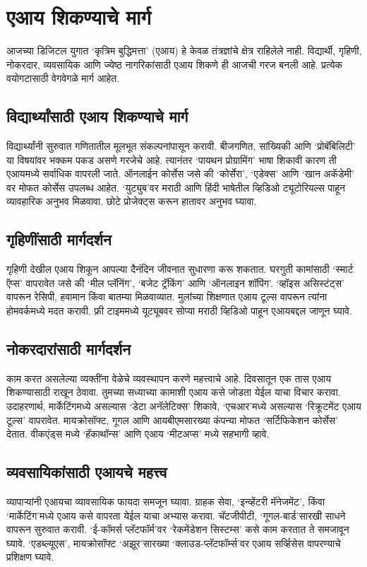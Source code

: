 \chapter{एआय शिकण्याचे मार्ग}

आजच्या डिजिटल युगात `कृत्रिम बुद्धिमत्ता' (एआय) हे केवळ तंत्रज्ञांचे क्षेत्र राहिलेले नाही. विद्यार्थी, गृहिणी, नोकरदार, व्यवसायिक आणि ज्येष्ठ नागरिकांसाठी एआय शिकणे ही आजची गरज बनली आहे. प्रत्येक वयोगटासाठी वेगवेगळे मार्ग आहेत.

\section*{विद्यार्थ्यांसाठी एआय शिकण्याचे मार्ग}

विद्यार्थ्यांनी सुरुवात गणितातील मूलभूत संकल्पनांपासून करावी. बीजगणित, सांख्यिकी आणि `प्रोबॅबिलिटी' या विषयांवर भक्कम पकड असणे गरजेचे आहे. त्यानंतर `पायथन प्रोग्रामिंग' भाषा शिकावी कारण ती एआयमध्ये सर्वाधिक वापरली जाते.  ऑनलाईन कोर्सेस जसे की `कोर्सेरा', `एडेक्स'  आणि `खान अकॅडेमी' वर मोफत कोर्सेस उपलब्ध आहेत. `युट्युब'वर मराठी आणि हिंदी भाषेतील व्हिडिओ ट्यूटोरियल्स पाहून व्यावहारिक अनुभव मिळवावा. छोटे प्रोजेक्ट्स करून हातावर अनुभव घ्यावा.

\section*{गृहिणींसाठी  मार्गदर्शन}
गृहिणी देखील एआय शिकून आपल्या दैनंदिन जीवनात सुधारणा करू शकतात. घरगुती कामांसाठी `स्मार्ट ऍप्स' वापरावेत जसे की `मील प्लॅनिंग', `बजेट ट्रॅकिंग' आणि `ऑनलाइन शॉपिंग'. `व्हॉइस असिस्टंट्स' वापरून रेसिपी, हवामान किंवा बातम्या मिळवाव्यात. मुलांच्या शिक्षणात एआय टूल्स वापरून त्यांना होमवर्कमध्ये मदत करावी. फ्री टाइममध्ये यूट्यूबवर सोप्या मराठी व्हिडिओ पाहून एआयबद्दल जाणून घ्यावे.

\section*{नोकरदारांसाठी मार्गदर्शन}
काम करत असलेल्या व्यक्तींना वेळेचे व्यवस्थापन करणे महत्त्वाचे आहे. दिवसातून एक तास एआय शिकण्यासाठी राखून ठेवावा. तुमच्या सध्याच्या कामाशी एआय कसे जोडता येईल याचा विचार करावा.
उदाहरणार्थ, मार्केटिंगमध्ये असल्यास `डेटा अनॅलेटिक्स' शिकावे, `एचआर'मध्ये असल्यास `रिक्रूटमेंट एआय टूल्स' वापरावेत. मायक्रोसॉफ्ट, गूगल आणि आयबीएमसारख्या कंपन्या मोफत `सर्टिफिकेशन कोर्सेस' देतात. वीकएंड्स मध्ये `हॅकाथॉन्स' आणि एआय `मीटअप्स' मध्ये सहभागी व्हावे.

\section*{व्यवसायिकांसाठी एआयचे महत्त्व}
व्यापार्‍यांनी एआयचा व्यावसायिक फायदा समजून घ्यावा. ग्राहक सेवा, `इन्व्हेंटरी मॅनेजमेंट', किंवा `मार्केटिंग'मध्ये एआय कसे वापरता येईल याचा अभ्यास करावा.  चॅटजीपीटी, `गूगल-बार्ड'सारखी साधने वापरून सुरुवात करावी. `ई-कॉमर्स प्लॅटफॉर्म'वर `रेकमेंडेशन सिस्टम्स' कसे काम करतात ते समजावून घ्यावे. `एडब्ल्यूएस', मायक्रोसॉफ्ट `अझूर'सारख्या `क्लाउड-प्लॅटफॉर्म्स'वर एआय सर्व्हिसेस वापरण्याचे प्रशिक्षण घ्यावे.

